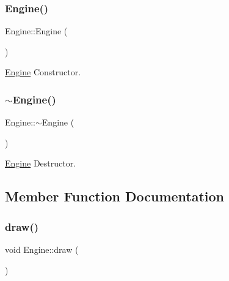 \subsubsection{\texorpdfstring{Engine()}{Engine()}}
{\footnotesize\ttfamily Engine\+::\+Engine (\begin{DoxyParamCaption}{ }\end{DoxyParamCaption})}



\hyperlink{class_engine}{Engine} Constructor. 

\mbox{\label{class_engine_a8ef7030a089ecb30bbfcb9e43094717a}} 
\subsubsection{\texorpdfstring{$\sim$\+Engine()}{~Engine()}}
{\footnotesize\ttfamily Engine\+::$\sim$\+Engine (\begin{DoxyParamCaption}{ }\end{DoxyParamCaption})\hspace{0.3cm}{\ttfamily [virtual]}}



\hyperlink{class_engine}{Engine} Destructor. 



\subsection{Member Function Documentation}
\mbox{\label{class_engine_a1b654dc41dfbcb5072147f33142b726e}} 
\subsubsection{\texorpdfstring{draw()}{draw()}}
{\footnotesize\ttfamily void Engine\+::draw (\begin{DoxyParamCaption}{ }\end{DoxyParamCaption})\hspace{0.3cm}{\ttfamily [private]}}

\mbox{\label{class_engine_a19be6708b8b65c5cfd8c13305f1e3c7f}} 
